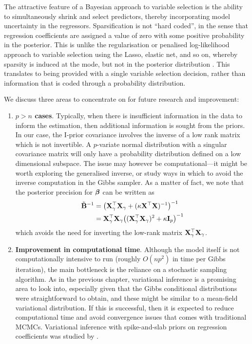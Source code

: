 \documentclass[showframe,11pt,twoside,openright]{report}
\begin{document}
The attractive feature of a Bayesian approach to variable selection is the ability to simultaneously shrink and select predictors, thereby incorporating model uncertainty in the regressors.
Sparsification is not ``hard coded'', in the sense that regression coefficients are assigned a value of zero with some positive probability in the posterior.
This is unlike the regularisation or penalised log-likelihood approach to variable selection using the Lasso, elastic net, and so on, whereby sparsity is induced at the mode, but not in the posterior distribution \citep{scott2014predicting}.
This translates to being provided with a single variable selection decision, rather than information that is coded through a probability distribution.

We discuss three areas to concentrate on for future research and improvement:
\begin{enumerate}
  \item \textbf{\boldmath$p>n$ cases}. 
  Typically, when there is insufficient information in the data to inform the estimation, then additional information is sought from the priors. 
  In our case, the I-prior covariance involves the inverse of a low rank matrix which is not invertible.
  A $p$-variate normal distribution with a singular covariance matrix will only have a probability distribution defined on a low dimensional subspace.
  The issue may however be computational---it might be worth exploring the generalised inverse, or study ways in which to avoid the inverse computation in the Gibbs sampler.
  As a matter of fact, we note that the posterior precision for ${\bm\beta}$ can be written as 
  \begin{align*}
    \tilde {{\mathbf B}}^{-1}
    &= \big({\mathbf X}_\gamma^\top {\mathbf X}_\gamma + (\kappa \mathbf X^\top \mathbf X)^{-1}\big)^{-1} \\
    &= {\mathbf X}_\gamma^\top {\mathbf X}_\gamma \big(({\mathbf X}_\gamma^\top {\mathbf X}_\gamma)^2 + \kappa {\mathbf I}_p \big)^{-1}
  \end{align*}
  which avoids the need for inverting the low-rank matrix ${\mathbf X}_\gamma^\top {\mathbf X}_\gamma$.
  
  \item \textbf{Improvement in computational time}. 
  Although the model itself is not computationally intensive to run (roughly $O(np^2)$ in time per Gibbs iteration), the main bottleneck is the reliance on a stochastic sampling algorithm.
  As in the previous chapter, variational inference is a promising area to look into, especially given that the Gibbs conditional distributions were straightforward to obtain, and these might be similar to a mean-field variational distribution.
  If this is successful, then it is expected to reduce computational time and avoid convergence issues that comes with traditional MCMCs.
  Variational inference with spike-and-slab priors on regression coefficients was studied by \citet{ormerod2017variational}.
  

\end{enumerate}
\end{document}
